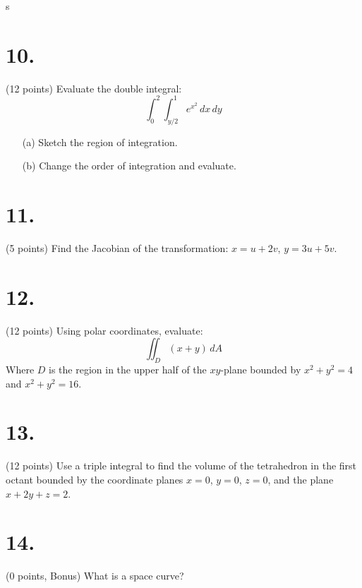 s\documentclass[12pt]{article}
\begin{document}
\newpage

\section*{10.}
(12 points) Evaluate the double integral:
\[
\int_0^2 \int_{y/2}^1 e^{x^2} \, dx\, dy
\]
\begin{itemize}
    \item[(a)] Sketch the region of integration.
    \item[(b)] Change the order of integration and evaluate.
\end{itemize}

\newpage

\section*{11.}\text
(5 points) Find the Jacobian of the transformation: $x = u + 2v$, $y = 3u + 5v$.

\section*{12.}
(12 points) Using polar coordinates, evaluate:
\[
\iint_D (x + y) \, dA
\]
Where $D$ is the region in the upper half of the $xy$-plane bounded by $x^2 + y^2 = 4$ and $x^2 + y^2 = 16$.

\newpage

\section*{13.}
(12 points) Use a triple integral to find the volume of the tetrahedron in the first octant bounded by the coordinate planes $x = 0$, $y = 0$, $z = 0$, and the plane $x + 2y + z = 2$.

\section*{14.}
(0 points, Bonus) What is a space curve?
\end{document}
